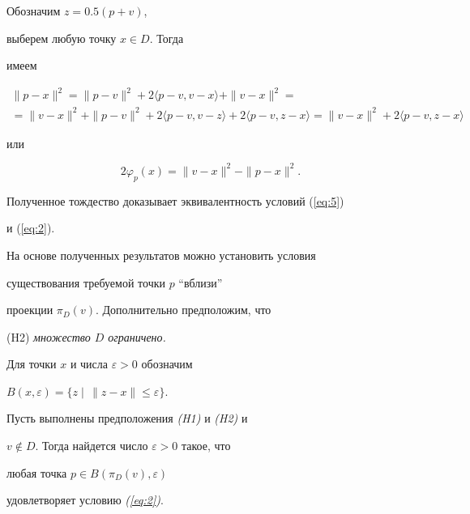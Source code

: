 \begin{pf} Обозначим $z=0.5(p+v)$,


выберем любую точку $ x\in D$. Тогда


имеем


\begin{gather*}


 \|p-x\|^2


  =  \|p-v\|^2


  + 2 \langle p -v, v-x\rangle + \| v- x\|^2= \\


 = \|v-x\|^2 + \| p- v\|^2


    + 2 \langle p -v, v-z\rangle 


 + 2 \langle p -v, z-x \rangle   


 = \|v-x\|^2 + 2 \langle p -v, z-x\rangle 


\end{gather*}


или


$$


 2\varphi_{p}(x) = \| v-x\|^2 -\|p-x\|^2.


$$


Полученное тождество доказывает эквивалентность условий (\ref{eq:5})


и (\ref{eq:2}).


\end{pf}





 На основе полученных результатов можно установить условия


существования требуемой точки $p$ ``вблизи''


проекции $\pi_D(v)$. Дополнительно предположим, что





(H2) {\it множество $D$ ограничено.}





Для точки $x$ и числа $\varepsilon >0$ обозначим


$


B (x, \varepsilon )= \{ z \mid\, \| z-x \| \leq\varepsilon \}$.








\begin{thm} \label{thm:1}


Пусть выполнены предположения {\em (H1)} и {\em (H2)} и


$v\notin D$. Тогда найдется число $\varepsilon >0$ такое, что


любая точка $ p \in B (\pi_D(v), \varepsilon )$


удовлетворяет условию {\em (\ref{eq:2})}.


\end{thm}






